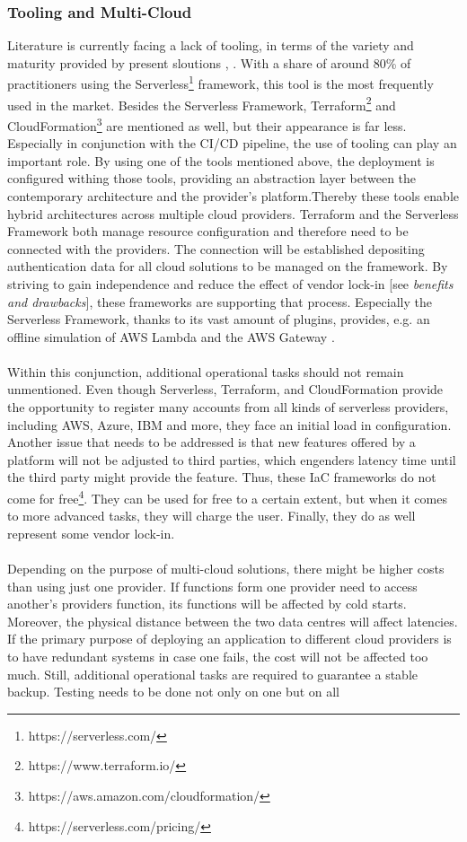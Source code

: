 \documentclass[11pt]{article}
\begin{document}
\subsubsection{Tooling and Multi-Cloud}
Literature is currently facing a lack of tooling, in terms of the variety and maturity provided by present sloutions \cite{Yussupov2019_SystematicMappingStudyFaaS}, \cite{leitner2019mixed}. With a share of around 80\% \cite{leitner2019mixed} of practitioners using the Serverless\footnote{https://serverless.com/} framework, this tool is the most frequently used in the market. Besides the Serverless Framework, Terraform\footnote{https://www.terraform.io/} and CloudFormation\footnote{https://aws.amazon.com/cloudformation/} are mentioned as well, but their appearance is far less. Especially in conjunction with the CI/CD pipeline, the use of tooling can play an important role. By using one of the tools mentioned above, the deployment is configured withing those tools, providing an abstraction layer between the contemporary architecture and the provider's platform.Thereby these tools enable hybrid architectures across multiple cloud providers. Terraform and the Serverless Framework both manage resource configuration and therefore need to be connected with the providers. The connection will be established depositing authentication data for all cloud solutions to be managed on the framework. By striving to gain independence and reduce the effect of vendor lock-in [see \textit{benefits and drawbacks}], these frameworks are supporting that process. Especially the Serverless Framework, thanks to its vast amount of plugins, provides, e.g. an offline simulation of AWS Lambda and the AWS Gateway \cite{lin2018tracking}.\\\\ Within this conjunction, additional operational tasks should not remain unmentioned. Even though Serverless, Terraform, and CloudFormation provide the opportunity to register many accounts from all kinds of serverless providers, including AWS, Azure, IBM and more, they face an initial load in configuration. Another issue that needs to be addressed is that new features offered by a platform will not be adjusted to third parties, which engenders latency time until the third party might provide the feature. Thus, these IaC frameworks do not come for free\footnote{https://serverless.com/pricing/}. They can be used for free to a certain extent, but when it comes to more advanced tasks, they will charge the user. Finally, they do as well represent some vendor lock-in.\\\\ Depending on the purpose of multi-cloud solutions, there might be higher costs than using just one provider. If functions form one provider need to access another's providers function, its functions will be affected by cold starts. Moreover, the physical distance between the two data centres will affect latencies. If the primary purpose of deploying an application to different cloud providers is to have redundant systems in case one fails, the cost will not be affected too much. Still, additional operational tasks are required to guarantee a stable backup. Testing needs to be done not only on one but on all 
\end{document}
